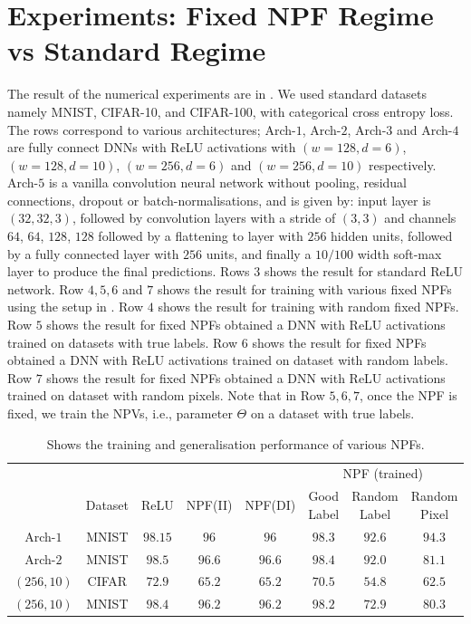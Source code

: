 \section{Experiments: Fixed NPF Regime vs  Standard Regime}\label{sec:generalisation}
The result of the numerical experiments are in . We used standard datasets namely MNIST, CIFAR-10, and CIFAR-100, with categorical cross entropy loss. The rows correspond to various architectures; Arch-$1$, Arch-$2$, Arch-$3$ and Arch-$4$ are fully connect DNNs with ReLU activations with $(w=128,d=6)$, $(w=128,d=10)$, $(w=256,d=6)$ and $(w=256,d=10)$ respectively. Arch-$5$ is a vanilla convolution neural network without pooling, residual connections, dropout or batch-normalisations, and is given by: input layer is $(32, 32, 3)$, followed by convolution layers with a stride of $(3, 3)$ and channels $64$, $64$, $128$, $128$ followed by a flattening to layer with $256$ hidden units, followed by a fully connected layer with $256$ units, and finally a  $10/100$ width soft-max layer to produce the final predictions. Rows $3$ shows the result for standard ReLU network. Row $4,5,6$ and $7$ shows the result for training with various fixed NPFs using the setup in . Row $4$ shows the result for training with random fixed NPFs. Row $5$ shows the result for fixed NPFs obtained a DNN with ReLU activations trained on datasets with true labels. Row $6$ shows the result for fixed NPFs obtained a DNN with ReLU activations trained on dataset with random labels. Row $7$ shows the result for fixed NPFs obtained a DNN with ReLU activations trained on dataset with random pixels. Note that in Row $5,6,7$, once the NPF is fixed, we train the NPVs, i.e., parameter $\Theta$ on a dataset with true labels.
\begin{table}[!b]
\begin{tabular}{|c|c|c|c|c|c|c|c|}\hline
&&&&&\multicolumn{3}{c|}{NPF (trained)}\\\cline{6-8}
	&Dataset		&ReLU		&NPF(II) &NPF(DI) 		&Good Label		&Random Label 	&Random Pixel\\\hline
Arch-$1$	& MNIST 		& $98.15$ 		&$96$&$96$ 		&$98.3$		&$92.6$			&$94.3$\\\hline
Arch-$2$	& MNIST 		& $98.5$ 		&$96.6$&$96.6$ 		&$98.4$		&$92.0$			&$81.1$\\\hline
$(256,10)$	& CIFAR 		& $72.9$ 		&$65.2$&$65.2$ 		&$70.5$		&$54.8$			&$62.5$\\\hline
$(256,10)$	& MNIST 		& $98.4$ 		&$96.2$&$96.2$ 		&$98.2$		&$72.9$			&$80.3$\\\hline
\end{tabular}
\caption{Shows the training and generalisation performance of various NPFs.}
\label{tb:npfs}
\end{table}

